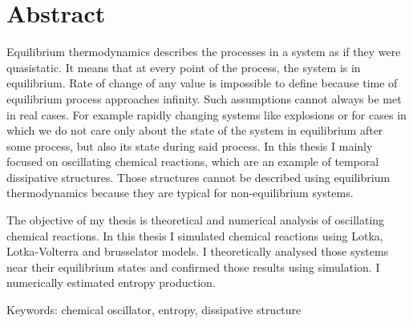 \documentclass[10pt, a4paper, twoside, onecolumn]{article}
\numberwithin{equation}{section}
\begin{document}
	\pagebreak
	
	\section*{Abstract}
	Equilibrium thermodynamics describes the processes in a system as if they were quasistatic. It means that at every point of the process, the system is in equilibrium. Rate of change of any value is impossible to define because time of equilibrium process approaches infinity. Such assumptions cannot always be met in real cases. For example rapidly changing systems like explosions or for cases in which we do not care only about the state of the system in equilibrium after some process, but also its state during said process. In this thesis I mainly focused on oscillating chemical reactions, which are an example of temporal dissipative structures. Those structures cannot be described using equilibrium thermodynamics because they are typical for non-equilibrium systems. \par
	The objective of my thesis is theoretical and numerical analysis of oscillating chemical reactions. In this thesis I simulated chemical reactions using Lotka, Lotka-Volterra and brusselator models. I theoretically analysed those systems near their equilibrium states and confirmed those results using simulation. I numerically estimated entropy production. \par\noindent
	Keywords: chemical oscillator, entropy, dissipative structure
	\pagebreak
	
	\tableofcontents
	\pagebreak
	
\end{document}
